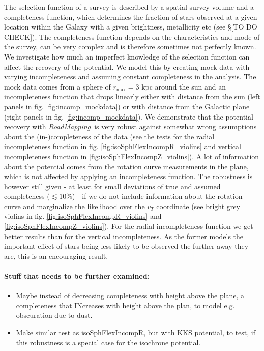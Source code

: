 \documentclass[12pt,preprint]{aastex}
\newcommand{\RM}{{\sl RoadMapping~}}
\begin{document}
The selection function of a survey is described by a spatial survey volume and a completeness function, which determines the fraction of stars observed at a given location within the Galaxy with a given brightness, metallicity etc (see \S[TO DO CHECK]). The completeness function depends on the characteristics and mode of the survey, can be very complex and is therefore sometimes not perfectly known. We investigate how much an imperfect knowledge of the selection function can affect the recovery of the potential. We model this by creating mock data with varying incompleteness and assuming constant completeness in the analysis. The mock data comes from a sphere of $r_\text{max} = 3$ kpc around the sun and an incompleteness function that drops linearly either with distance from the sun (left panels in fig. \ref{fig:incomp_mockdata}) or with distance from the Galactic plane (right panels in fig. \ref{fig:incomp_mockdata}). We demonstrate that the potential recovery with  \RM is very robust against somewhat wrong assumptions about the (in-)completeness of the data (see the tests for the radial incompleteness function in fig. \ref{fig:isoSphFlexIncompR_violins} and vertical incompleteness function in \ref{fig:isoSphFlexIncompZ_violins}). A lot of information about the potential comes from the rotation curve measurements in the plane, which is not affected by applying an incompleteness function. The robustness is however still given - at least for small deviations of true and assumed completeness ($\lesssim 10\%$) - if we do not include information about the rotation curve and marginalize the likelihood over the $v_T$ coordinate (see bright grey violins in fig. \ref{fig:isoSphFlexIncompR_violins} and \ref{fig:isoSphFlexIncompZ_violins}). For the radial incompleteness function we get better results than for the vertical incompleteness. As the former models the important effect of stars being less likely to be observed the further away they are, this is an encouraging result.

\paragraph{Stuff that needs to be further examined:}
\begin{itemize}
\item Maybe instead of decreasing completeness with height above the plane, a completeness that INcreases with height above the plan, to model e.g. obscuration due to dust.
\item Make similar test as isoSphFlexIncompR, but with KKS potential, to test, if this robustness is a special case for the isochrone potential.
\end{itemize}
\end{document}
